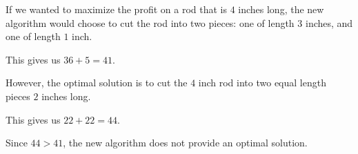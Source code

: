 \documentclass[12pt,letterpaper]{article}
\begin{document}
\begin{enumerate}
      If we wanted to maximize the profit on a rod that is $4$ inches long,
      the new algorithm would choose to cut the rod into two pieces:
      one of length $3$ inches, and one of length $1$ inch.

      This gives us $36 + 5 = 41$.

      However, the optimal solution is to cut the $4$ inch rod into two equal length pieces $2$ inches long.

      This gives us $22 + 22 = 44$.

      Since $44 > 41$, the new algorithm does not provide an optimal solution.

  \end{enumerate}
\end{document}
